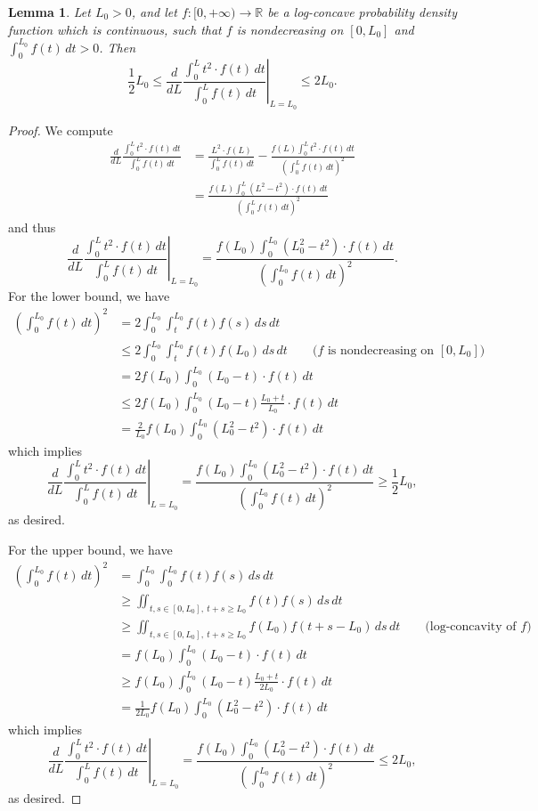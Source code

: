 \documentclass[11pt]{article}
\numberwithin{equation}{section}
\newtheorem{lemma}{Lemma}[section]
\theoremstyle{definition}
\newcommand{\R}{\mathbb{R}}
\begin{document}
\begin{lemma}
\label{lem:aux-logconcave-ratio}
Let $L_0>0$, and let
$f:[0,+\infty)\to\R$ be a log-concave probability density function which is
continuous, such that
$f$ is nondecreasing on
$[0,L_0]$ and
$\int_0^{L_0}f(t)\,dt>0$.
Then
\[
\frac12L_0
\le \left.\frac{d}{dL}\frac{\int_0^L t^2\cdot f(t)\,dt}{\int_0^L f(t)\,dt}\right|_{L=L_0}
\le2L_0.
\]
\end{lemma}
\begin{proof}
We compute
\begin{align*}
\frac{d}{dL}\frac{\int_0^L t^2\cdot f(t)\,dt}{\int_0^L f(t)\,dt}
&=\frac{L^2\cdot f(L)}{\int_0^Lf(t)\,dt}
-\frac{f(L)\int_0^Lt^2\cdot f(t)\,dt}{\left(\int_0^Lf(t)\,dt\right)^2}\\
&=\frac{f(L)\int_0^L(L^2-t^2)\cdot f(t)\,dt}{\left(\int_0^Lf(t)\,dt\right)^2}
\end{align*}
and thus
\[
\left.\frac{d}{dL}\frac{\int_0^L t^2\cdot f(t)\,dt}{\int_0^L f(t)\,dt}\right|_{L=L_0}
=\frac{f(L_0)\int_0^{L_0}(L_0^2-t^2)\cdot f(t)\,dt}{\left(\int_0^{L_0}f(t)\,dt\right)^2}.
\]
For the lower bound, we have
\begin{align*}
\left(\int_0^{L_0}f(t)\,dt\right)^2
&=2\int_0^{L_0}\int_t^{L_0}f(t)f(s)\,ds\,dt\\
&\le2\int_0^{L_0}\int_t^{L_0}f(t)f(L_0)\,ds\,dt \qquad\text{($f$ is nondecreasing on $[0,L_0]$)}\\
&=2f(L_0)\int_0^{L_0}(L_0-t)\cdot f(t)\,dt\\
&\le2f(L_0)\int_0^{L_0}(L_0-t)\frac{L_0+t}{L_0}\cdot f(t)\,dt\\
&=\frac2{L_0}f(L_0)\int_0^{L_0}(L_0^2-t^2)\cdot f(t)\,dt
\end{align*}
which implies
\[
\left.\frac{d}{dL}\frac{\int_0^L t^2\cdot f(t)\,dt}{\int_0^L f(t)\,dt}\right|_{L=L_0}
=\frac{f(L_0)\int_0^{L_0}(L_0^2-t^2)\cdot f(t)\,dt}{\left(\int_0^{L_0}f(t)\,dt\right)^2}
\ge\frac12L_0,
\]
as desired.

For the upper bound, we have
\begin{align*}
\left(\int_0^{L_0}f(t)\,dt\right)^2
&=\int_0^{L_0}\int_0^{L_0}f(t)f(s)\,ds\,dt\\
&\ge\iint_{t,s\in[0,L_0],\ t+s\ge L_0}f(t)f(s)\,ds\,dt\\
&\ge\iint_{t,s\in[0,L_0],\ t+s\ge L_0}f(L_0)f(t+s-L_0)\,ds\,dt \qquad\text{(log-concavity of $f$)}\\
&=f(L_0)\int_0^{L_0}(L_0-t)\cdot f(t)\,dt\\
&\ge f(L_0)\int_0^{L_0}(L_0-t)\frac{L_0+t}{2L_0}\cdot f(t)\,dt\\
&=\frac1{2L_0}f(L_0)\int_0^{L_0}(L_0^2-t^2)\cdot f(t)\,dt
\end{align*}
which implies
\[
\left.\frac{d}{dL}\frac{\int_0^L t^2\cdot f(t)\,dt}{\int_0^L f(t)\,dt}\right|_{L=L_0}
=\frac{f(L_0)\int_0^{L_0}(L_0^2-t^2)\cdot f(t)\,dt}{\left(\int_0^{L_0}f(t)\,dt\right)^2}
\le2L_0,
\]
as desired.
\end{proof}
\end{document}
